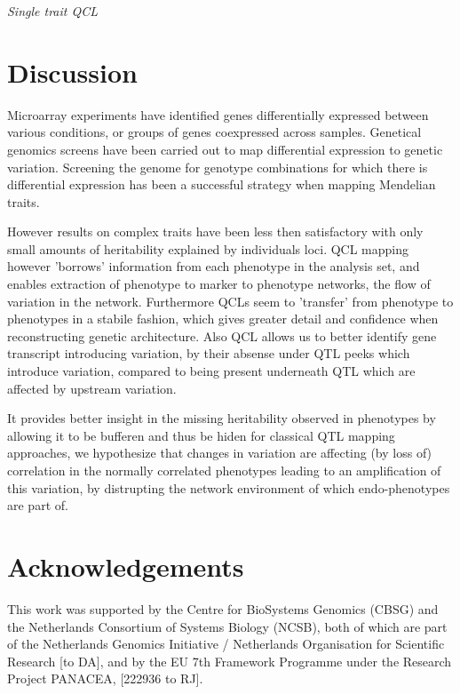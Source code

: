 \documentclass[12pt]{article}
\begin{document}
  \emph{\sffamily Single trait QCL}\\
  

\bigskip
\section*{Discussion}
\nopagebreak

  Microarray experiments have identified genes differentially expressed between various 
  conditions, or groups of genes coexpressed across samples. Genetical genomics screens 
  have been carried out to map differential expression to genetic variation. Screening 
  the genome for genotype combinations for which there is differential expression has 
  been a successful strategy when mapping Mendelian traits. 
  
  However results on complex traits have been less then satisfactory with only small 
  amounts of heritability explained by individuals loci. QCL mapping however 'borrows' 
  information from each phenotype in the analysis set, and enables extraction of 
  phenotype to marker to phenotype networks, the flow of variation in the network. 
  Furthermore QCLs seem to 'transfer' from phenotype to phenotypes in a stabile 
  fashion, which gives greater detail and confidence when reconstructing genetic 
  architecture. Also QCL allows us to better identify gene transcript introducing 
  variation, by their absense under QTL peeks which introduce variation, compared 
  to being present underneath QTL which are affected by upstream variation.
  
  It provides better insight in the missing heritability observed in phenotypes by 
  allowing it to be bufferen and thus be hiden for classical QTL mapping approaches, we 
  hypothesize that changes in variation are affecting (by loss of) correlation in 
  the normally correlated phenotypes leading to an amplification of this variation, 
  by distrupting the network environment of which endo-phenotypes are part of.

\section*{Acknowledgements}
  This work was supported by the Centre for BioSystems Genomics (CBSG) and the 
  Netherlands Consortium of Systems Biology (NCSB), both of which are part of the Netherlands 
  Genomics Initiative / Netherlands Organisation for Scientific Research [to DA], and 
  by the EU 7th Framework Programme under the Research Project PANACEA, [222936 to RJ].
\end{document}
